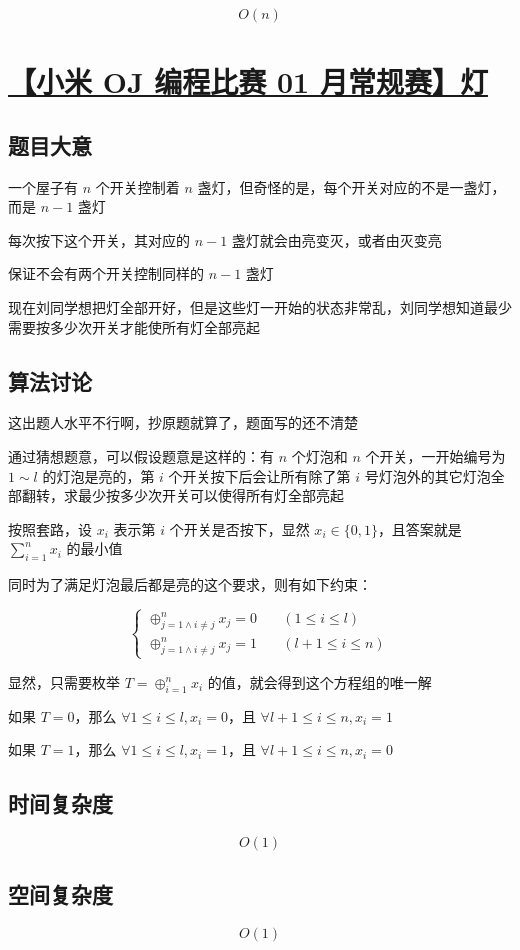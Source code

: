 \documentclass[UTF8]{article}
\begin{document}
$$
O(n)
$$

\section{\href{https://code.mi.com/problem/list/view?id=125}{【小米 OJ 编程比赛 01 月常规赛】灯}}

\subsection{题目大意}

一个屋子有 $n$ 个开关控制着 $n$ 盏灯，但奇怪的是，每个开关对应的不是一盏灯，而是 $n-1$ 盏灯

每次按下这个开关，其对应的 $n-1$ 盏灯就会由亮变灭，或者由灭变亮

保证不会有两个开关控制同样的 $n-1$ 盏灯

现在刘同学想把灯全部开好，但是这些灯一开始的状态非常乱，刘同学想知道最少需要按多少次开关才能使所有灯全部亮起

\subsection{算法讨论}

这出题人水平不行啊，抄原题就算了，题面写的还不清楚

通过猜想题意，可以假设题意是这样的：有 $n$ 个灯泡和 $n$ 个开关，一开始编号为 $1 \sim l$ 的灯泡是亮的，第 $i$ 个开关按下后会让所有除了第 $i$ 号灯泡外的其它灯泡全部翻转，求最少按多少次开关可以使得所有灯全部亮起

按照套路，设 $x_i$ 表示第 $i$ 个开关是否按下，显然 $x_i \in \{0,1\}$，且答案就是 $\sum_{i=1}^{n}x_i$ 的最小值

同时为了满足灯泡最后都是亮的这个要求，则有如下约束：

$$
\begin{cases}
\oplus_{j=1 \wedge i \not= j}^{n}x_j = 0 \quad & (1 \le i \le l) \\
\oplus_{j=1 \wedge i \not= j}^{n}x_j = 1 \quad & (l+1 \le i \le n)
\end{cases}
$$

显然，只需要枚举 $T=\oplus_{i=1}^{n}x_i$ 的值，就会得到这个方程组的唯一解

如果 $T=0$，那么 $\forall 1 \le i \le l,x_i=0$，且 $\forall l+1 \le i \le n,x_i=1$

如果 $T=1$，那么 $\forall 1 \le i \le l,x_i=1$，且 $\forall l+1 \le i \le n,x_i=0$

\subsection{时间复杂度}

$$
O(1)
$$

\subsection{空间复杂度}

$$
O(1)
$$
\end{document}
